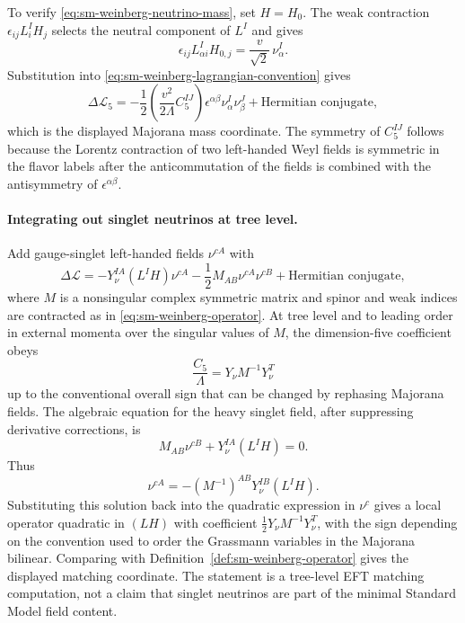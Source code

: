To verify \eqref{eq:sm-weinberg-neutrino-mass}, set \(H=H_0\).  The weak
contraction
\(\epsilon_{ij}L^I_iH_j\) selects the neutral component of \(L^I\) and gives
\[
  \epsilon_{ij}L^I_{\alpha i}H_{0,j}
  =
  \frac{v}{\sqrt2}\,\nu^I_{\alpha}.
\]
Substitution into \eqref{eq:sm-weinberg-lagrangian-convention} gives
\[
  \Delta\mathcal L_5
  =
  -\frac{1}{2}
  \left(\frac{v^2}{2\Lambda}C_5^{IJ}\right)
  \epsilon^{\alpha\beta}\nu^I_\alpha\nu^J_\beta
  +\text{Hermitian conjugate},
\]
which is the displayed Majorana mass coordinate.  The symmetry of
\(C_5^{IJ}\) follows because the Lorentz contraction of two left-handed Weyl
fields is symmetric in the flavor labels after the anticommutation of the
fields is combined with the antisymmetry of
\(\epsilon^{\alpha\beta}\).

\paragraph{Integrating out singlet neutrinos at tree level.}
Add gauge-singlet left-handed fields \(\nu^{cA}\) with
\[
  \Delta\mathcal L
  =
  -Y_\nu^{IA}(L^I H)\nu^{cA}
  -\frac{1}{2}M_{AB}\nu^{cA}\nu^{cB}
  +\text{Hermitian conjugate},
\]
where \(M\) is a nonsingular complex symmetric matrix and spinor and weak
indices are contracted as in \eqref{eq:sm-weinberg-operator}.  At tree level
and to leading order in external momenta over the singular values of \(M\),
the dimension-five coefficient obeys
\[
  \frac{C_5}{\Lambda}
  =
  Y_\nu M^{-1}Y_\nu^{T}
\]
up to the conventional overall sign that can be changed by rephasing
Majorana fields.
The algebraic equation for the heavy singlet field, after suppressing
derivative corrections, is
\[
  M_{AB}\nu^{cB}+Y_\nu^{IA}(L^I H)=0 .
\]
Thus
\[
  \nu^{cA}=-(M^{-1})^{AB}Y_\nu^{IB}(L^I H).
\]
Substituting this solution back into the quadratic expression in
\(\nu^c\) gives a local operator quadratic in \((LH)\) with coefficient
\(\frac12Y_\nu M^{-1}Y_\nu^T\), with the sign depending on the convention
used to order the Grassmann variables in the Majorana bilinear.  Comparing
with Definition~\ref{def:sm-weinberg-operator} gives the displayed matching
coordinate.  The statement is a tree-level EFT matching computation, not a
claim that singlet neutrinos are part of the minimal Standard Model field
content.

